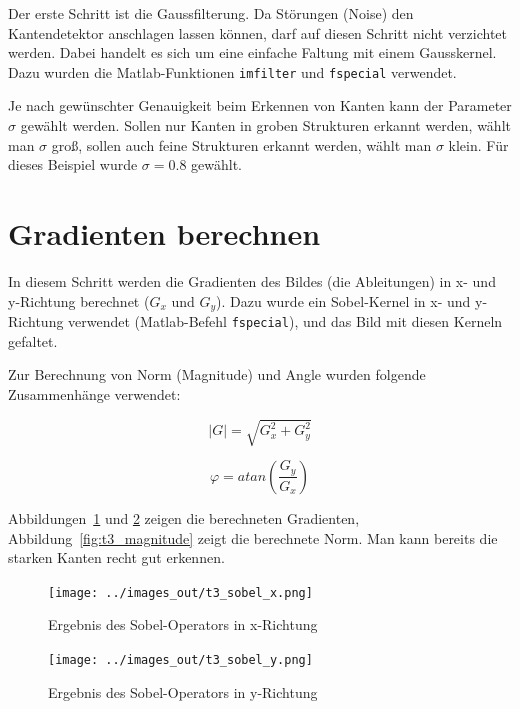 Der erste Schritt ist die Gaussfilterung. Da Störungen (Noise) den Kantendetektor anschlagen lassen können, darf auf diesen Schritt nicht verzichtet werden. Dabei handelt es sich um eine einfache Faltung mit einem Gausskernel. Dazu wurden die Matlab-Funktionen \texttt{imfilter} und \texttt{fspecial} verwendet.

Je nach gewünschter Genauigkeit beim Erkennen von Kanten kann der Parameter $\sigma$ gewählt werden. Sollen nur Kanten in groben Strukturen erkannt werden, wählt man $\sigma$ groß, sollen auch feine Strukturen erkannt werden, wählt man $\sigma$ klein. Für dieses Beispiel wurde $\sigma = 0.8$ gewählt.


\section{Gradienten berechnen}

In diesem Schritt werden die Gradienten des Bildes (die Ableitungen) in x- und y-Richtung berechnet ($G_x$ und $G_y$). Dazu wurde ein Sobel-Kernel in x- und y-Richtung verwendet (Matlab-Befehl \texttt{fspecial}), und das Bild mit diesen Kerneln gefaltet.

Zur Berechnung von Norm (Magnitude) und Angle wurden folgende Zusammenhänge verwendet:

\begin{equation}
 \left|G\right| = \sqrt{G_x^2 + G_y^2}
\end{equation}

\begin{equation}
 \varphi = atan \left( \frac{G_y}{G_x} \right)
\end{equation}

Abbildungen~\ref{fig:t3_sobel_x} und \ref{fig:t3_sobel_y} zeigen die berechneten Gradienten, Abbildung~\ref{fig:t3_magnitude} zeigt die berechnete Norm. Man kann bereits die starken Kanten recht gut erkennen.

\smallskip

\begin{figure}[htb]
 \centering
 \texttt{[image: ../images\_out/t3\_sobel\_x.png]}
 \caption{Ergebnis des Sobel-Operators in x-Richtung}
 \label{fig:t3_sobel_x}
\end{figure}

\begin{figure}[htb]
 \centering
 \texttt{[image: ../images\_out/t3\_sobel\_y.png]}
 \caption{Ergebnis des Sobel-Operators in y-Richtung}
 \label{fig:t3_sobel_y}
\end{figure}

